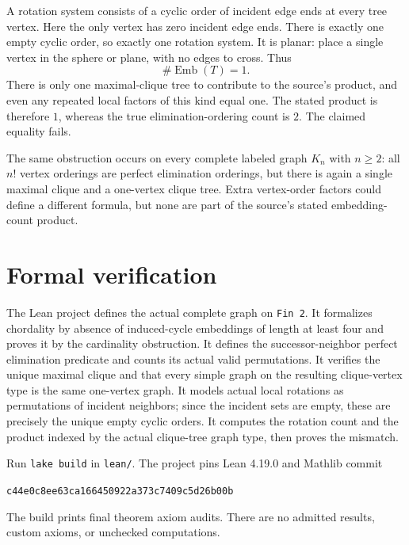 \documentclass[11pt]{article}
\begin{document}
A rotation system consists of a cyclic order of incident edge ends at every tree vertex. Here the only vertex has zero incident edge ends. There is exactly one empty cyclic order, so exactly one rotation system. It is planar: place a single vertex in the sphere or plane, with no edges to cross. Thus
\[
 \#\operatorname{Emb}(T)=1.
\]
There is only one maximal-clique tree to contribute to the source's product, and even any repeated local factors of this kind equal one. The stated product is therefore $1$, whereas the true elimination-ordering count is $2$. The claimed equality fails.

The same obstruction occurs on every complete labeled graph $K_n$ with $n\ge2$: all $n!$ vertex orderings are perfect elimination orderings, but there is again a single maximal clique and a one-vertex clique tree. Extra vertex-order factors could define a different formula, but none are part of the source's stated embedding-count product.

\section*{Formal verification}
The Lean project defines the actual complete graph on \texttt{Fin 2}. It formalizes chordality by absence of induced-cycle embeddings of length at least four and proves it by the cardinality obstruction. It defines the successor-neighbor perfect elimination predicate and counts its actual valid permutations. It verifies the unique maximal clique and that every simple graph on the resulting clique-vertex type is the same one-vertex graph. It models actual local rotations as permutations of incident neighbors; since the incident sets are empty, these are precisely the unique empty cyclic orders. It computes the rotation count and the product indexed by the actual clique-tree graph type, then proves the mismatch.

Run \texttt{lake build} in \texttt{lean/}. The project pins Lean 4.19.0 and Mathlib commit
\begin{center}\small\texttt{c44e0c8ee63ca166450922a373c7409c5d26b00b}\end{center}
The build prints final theorem axiom audits. There are no admitted results, custom axioms, or unchecked computations.
\end{document}
